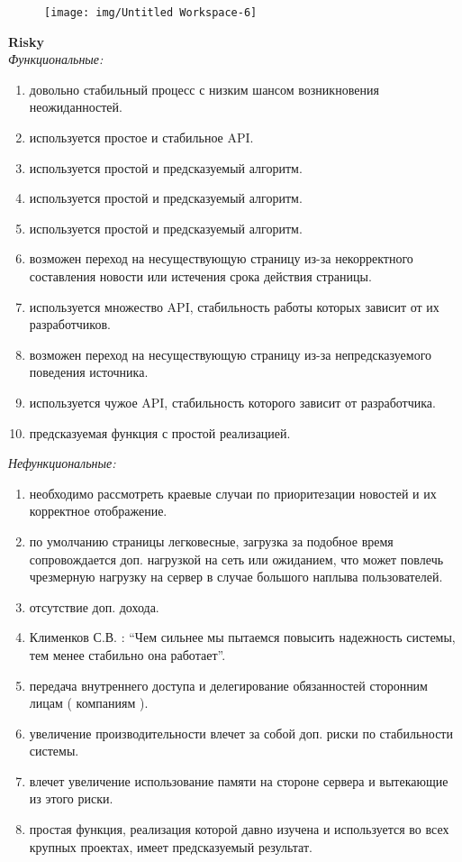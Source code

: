 \begin{center}
    \begin{figure}[H]
        \centering
        \texttt{[image: img/Untitled Workspace-6]}
    \end{figure}
\end{center}
\newpage
\BgThispage
\LARGE
\textbf{Risky}\\
\normalsize
\vspace{0.5cm}
\textit{Функциональные:}
\begin{enumerate}[noitemsep,topsep=0pt,parsep=0pt,partopsep=0pt]
    \item довольно стабильный процесс с низким шансом возникновения неожиданностей.
    \item используется простое и стабильное API.
    \item используется простой и предсказуемый алгоритм.
    \item используется простой и предсказуемый алгоритм.
    \item используется простой и предсказуемый алгоритм.
    \item возможен переход на несуществующую страницу из-за некорректного составления новости или истечения срока действия страницы.
    \item используется множество API, стабильность работы которых зависит от их разработчиков.
    \item возможен переход на несуществующую страницу из-за непредсказуемого поведения источника.
    \item используется чужое API, стабильность которого зависит от разработчика.
    \item предсказуемая функция с простой реализацией.
\end{enumerate}
\vspace{0.5cm}
\textit{Нефункциональные:}
\begin{enumerate}[noitemsep,topsep=0pt,parsep=0pt,partopsep=0pt]
    \item необходимо рассмотреть краевые случаи по приоритезации новостей и их корректное отображение.
    \item по умолчанию страницы легковесные, загрузка за подобное время сопровождается доп. нагрузкой на сеть или ожиданием, что может повлечь чрезмерную нагрузку на сервер в случае большого наплыва пользователей.
    \item отсутствие доп. дохода.
    \item Клименков С.В. : “Чем сильнее мы пытаемся повысить надежность системы, тем менее стабильно она работает”.
    \item передача внутреннего доступа и делегирование обязанностей сторонним лицам ( компаниям ).
    \item увеличение производительности влечет за собой доп. риски по стабильности системы.
    \item влечет увеличение использование памяти на стороне сервера и вытекающие из этого риски.
    \item простая функция, реализация которой давно изучена и используется во всех крупных проектах, имеет предсказуемый результат.
\end{enumerate}
